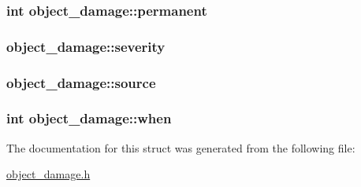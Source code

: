 \hypertarget{structobject__damage_a1b4e2d08c8a94a65ea4ed403ccb206ae}{
\subsubsection[{permanent}]{\setlength{\rightskip}{0pt plus 5cm}int object\-\_\-damage\-::permanent}}\label{structobject__damage_a1b4e2d08c8a94a65ea4ed403ccb206ae}
\hypertarget{structobject__damage_ac029b8185754dd9abcaa9b5d293f8106}{
\subsubsection[{severity}]{ object\-\_\-damage\-::severity}}\label{structobject__damage_ac029b8185754dd9abcaa9b5d293f8106}
\hypertarget{structobject__damage_a108f533495c2f06bfa2b89209f761486}{
\subsubsection[{source}]{ object\-\_\-damage\-::source}}\label{structobject__damage_a108f533495c2f06bfa2b89209f761486}
\hypertarget{structobject__damage_a1d60581e627a8a3412a25e3bb2efdca5}{
\subsubsection[{when}]{\setlength{\rightskip}{0pt plus 5cm}int object\-\_\-damage\-::when}}\label{structobject__damage_a1d60581e627a8a3412a25e3bb2efdca5}


The documentation for this struct was generated from the following file\-:\begin{DoxyCompactItemize}
\item 
\hyperlink{object__damage_8h}{object\-\_\-damage.\-h}\end{DoxyCompactItemize}
